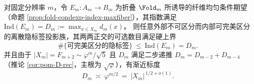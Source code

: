 \begin{corollary}\label{cor:dephys-fold-hidden-label-cap-sqrt}
对固定分辨率 \(m\)，令 \(E_m:A_m\to B_m\) 为折叠 \(\Fold_m\) 所诱导的纤维均匀条件期望（命题 \ref{prop:fold-condexp-index-maxfiber}），其指数满足
\(\mathrm{Ind}(E_m)=D_m:=\max_{x\in X_m}d_m(x)\)。
则任意外部不可区分而内部可完美区分的离散隐标签投影族，其两两正交的可选数目满足硬上界
\[
\#\{\text{可完美区分的隐标签}\}\ \le\ \mathrm{Ind}(E_m)=D_m.
\]
并且由于 \(|X_m|=F_{m+2}\sim \varphi^{m}/\sqrt5\) 且 \(D_m\) 满足二步递推 \(D_m=D_{m-2}+D_{m-4}\)（推论 \ref{cor:pom-D-rec}，主根为 \(\sqrt{\varphi}\)），有渐近标度
\[
D_m\ \asymp\ \varphi^{m/2}\ =\ |X_m|^{\,1/2+o(1)}.
\]
\end{corollary}
